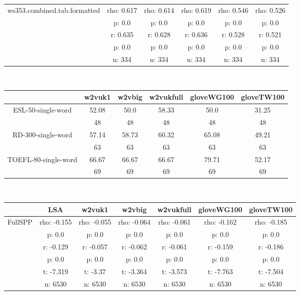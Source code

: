 \documentclass{article}
\begin{document}
\begin{tabular}{cccccc|}
\hline
\multicolumn{1}{|c|}{\multirow{5}{*}{ws353.combined.tab.formatted}} & rho: 0.617 & rho: 0.614 & rho: 0.619 & rho: 0.546 & rho: 0.526 \\
\multicolumn{1}{|c|}{} & p: 0.0 & p: 0.0 & p: 0.0 & p: 0.0 & p: 0.0 \\
\multicolumn{1}{|c|}{} & r: 0.635 & r: 0.628 & r: 0.636 & r: 0.528 & r: 0.521 \\
\multicolumn{1}{|c|}{} & p: 0.0 & p: 0.0 & p: 0.0 & p: 0.0 & p: 0.0 \\
\multicolumn{1}{|c|}{} & n: 334 & n: 334 & n: 334 & n: 334 & n: 334 \\
\hline
\end{tabular}\\
\begin{tabular}{cccccc|}\cline{2-6}
&\multicolumn{1}{|c}{w2vuk1} & w2vbig & w2vukfull & gloveWG100 & gloveTW100 \\\hline
\multicolumn{1}{|c|}{\multirow{2}{*}{ESL-50-single-word}} & 52.08 & 50.0 & 58.33 & 50.0 & 31.25 \\
\multicolumn{1}{|c|}{} & 48 & 48 & 48 & 48 & 48 \\
\hline
\multicolumn{1}{|c|}{\multirow{2}{*}{RD-300-single-word}} & 57.14 & 58.73 & 60.32 & 65.08 & 49.21 \\
\multicolumn{1}{|c|}{} & 63 & 63 & 63 & 63 & 63 \\
\hline
\multicolumn{1}{|c|}{\multirow{2}{*}{TOEFL-80-single-word}} & 66.67 & 66.67 & 66.67 & 79.71 & 52.17 \\
\multicolumn{1}{|c|}{} & 69 & 69 & 69 & 69 & 69 \\
\hline
\end{tabular}\\
\begin{tabular}{ccccccc|}\cline{2-7}
&\multicolumn{1}{|c}{LSA} & w2vuk1 & w2vbig & w2vukfull & gloveWG100 & gloveTW100 \\\hline
\multicolumn{1}{|c|}{\multirow{6}{*}{FullSPP}} & rho: -0.155 & rho: -0.055 & rho: -0.064 & rho: -0.061 & rho: -0.162 & rho: -0.185 \\
\multicolumn{1}{|c|}{} & p: 0.0 & p: 0.0 & p: 0.0 & p: 0.0 & p: 0.0 & p: 0.0 \\
\multicolumn{1}{|c|}{} & r: -0.129 & r: -0.057 & r: -0.062 & r: -0.061 & r: -0.159 & r: -0.186 \\
\multicolumn{1}{|c|}{} & p: 0.0 & p: 0.0 & p: 0.0 & p: 0.0 & p: 0.0 & p: 0.0 \\
\multicolumn{1}{|c|}{} & t: -7.319 & t: -3.37 & t: -3.364 & t: -3.573 & t: -7.763 & t: -7.504 \\
\multicolumn{1}{|c|}{} & n: 6530 & n: 6530 & n: 6530 & n: 6530 & n: 6530 & n: 6530 \\
\hline
\end{tabular}\\
\end{document}
